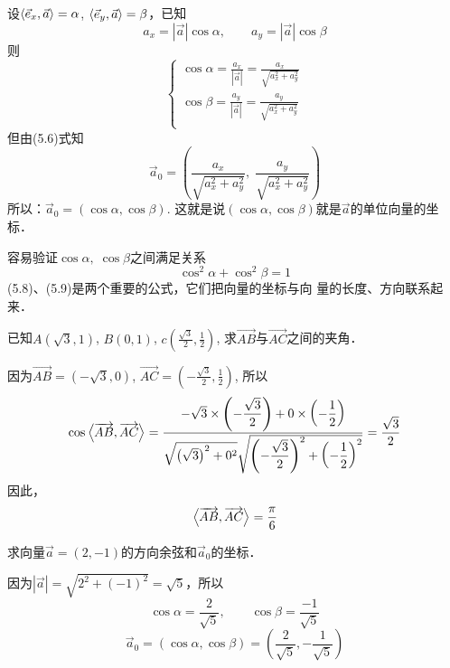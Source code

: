 设$\left\langle \vec{e}_x,\vec{a} \right\rangle=\alpha$, $\left\langle \vec{e}_y,\vec{a} \right\rangle=\beta$，已知
\[a_x=|\vec{a}|\cos\alpha,\qquad a_y=|\vec{a}|\cos\beta\]
则
\begin{equation}
    \begin{cases}
\cos\alpha=\frac{a_x}{|\vec{a}|}=\frac{a_x}{\sqrt{a_x^2+a_y^2}}\\
\cos\beta=\frac{a_y}{|\vec{a}|}=\frac{a_y}{\sqrt{a_x^2+a_y^2}}\\
    \end{cases}
\end{equation}
但由(5.6)式知
\[\vec{a}_0=\left(\frac{a_x}{\sqrt{a_x^2+a_y^2}},\; \frac{a_y}{\sqrt{a_x^2+a_y^2}}\right)\]
所以：$\vec{a}_0=(\cos\alpha,\cos\beta)$. 这就是说$(\cos\alpha,\cos\beta)$就是$\vec{a}$的单位向量的坐标．

容易验证$\cos\alpha,\; \cos\beta$之间满足关系
\begin{equation}
    \cos^2\alpha+\cos^2\beta=1
\end{equation}
(5.8)、(5.9)是两个重要的公式，它们把向量的坐标与向
量的长度、方向联系起来．

\begin{example}
  已知$A(\sqrt{3},1)$, $B(0,1)$, 
$c\left(\frac{\sqrt{3}}{2},\frac{1}{2}\right)$, 
求$\Vec{AB}$与$\Vec{AC}$之间的夹角．  
\end{example}

\begin{solution}
因为$\Vec{AB}=(-\sqrt{3},0)$, $\Vec{AC}=\left(-\frac{\sqrt{3}}{2},\frac{1}{2}\right)$, 所以
\[\cos \left\langle \overrightarrow{AB},\overrightarrow{AC} \right\rangle =\dfrac{-\sqrt{3}\times\left(-\dfrac{\sqrt{3}}{2}\right)+0\times \left(-\dfrac{1}{2}\right)}{\sqrt{\left(\sqrt{3}\right)^2+0^2}\sqrt{\left(-\dfrac{\sqrt{3}}{2}\right)^2+\left(-\dfrac{1}{2}\right)^2}}=\dfrac{\sqrt{3}}{2}\]
因此，
\[\left\langle \overrightarrow{AB},\overrightarrow{AC} \right\rangle=\dfrac{\pi}{6}\]
\end{solution}

\begin{example}
    求向量$\vec{a}=(2,-1)$的方向余弦和$\vec{a}_0$的坐标．
\end{example}

\begin{solution}
因为$|\vec{a}|=\sqrt{2^2+(-1)^2}=\sqrt{5}$，所以
\[\cos\alpha=\frac{2}{\sqrt{5}},\qquad \cos\beta=\frac{-1}{\sqrt{5}}\]
\[\vec{a}_0=(\cos\alpha,\cos\beta)=\left(\frac{2}{\sqrt{5}},-\frac{1}{\sqrt{5}}\right)\]
\end{solution}

